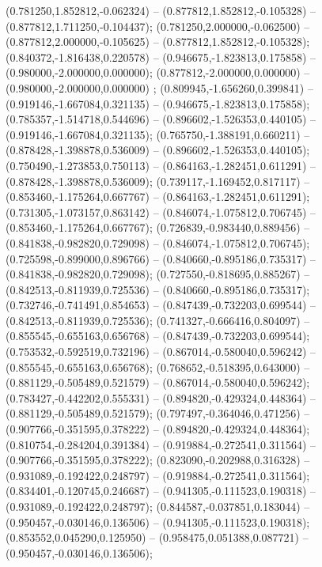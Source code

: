  (0.781250,1.852812,-0.062324) -- (0.877812,1.852812,-0.105328) -- (0.877812,1.711250,-0.104437);
 (0.781250,2.000000,-0.062500) -- (0.877812,2.000000,-0.105625) -- (0.877812,1.852812,-0.105328);
 (0.840372,-1.816438,0.220578) -- (0.946675,-1.823813,0.175858) -- (0.980000,-2.000000,0.000000);
 (0.877812,-2.000000,0.000000) -- (0.980000,-2.000000,0.000000) ;
 (0.809945,-1.656260,0.399841) -- (0.919146,-1.667084,0.321135) -- (0.946675,-1.823813,0.175858);
 (0.785357,-1.514718,0.544696) -- (0.896602,-1.526353,0.440105) -- (0.919146,-1.667084,0.321135);
 (0.765750,-1.388191,0.660211) -- (0.878428,-1.398878,0.536009) -- (0.896602,-1.526353,0.440105);
 (0.750490,-1.273853,0.750113) -- (0.864163,-1.282451,0.611291) -- (0.878428,-1.398878,0.536009);
 (0.739117,-1.169452,0.817117) -- (0.853460,-1.175264,0.667767) -- (0.864163,-1.282451,0.611291);
 (0.731305,-1.073157,0.863142) -- (0.846074,-1.075812,0.706745) -- (0.853460,-1.175264,0.667767);
 (0.726839,-0.983440,0.889456) -- (0.841838,-0.982820,0.729098) -- (0.846074,-1.075812,0.706745);
 (0.725598,-0.899000,0.896766) -- (0.840660,-0.895186,0.735317) -- (0.841838,-0.982820,0.729098);
 (0.727550,-0.818695,0.885267) -- (0.842513,-0.811939,0.725536) -- (0.840660,-0.895186,0.735317);
 (0.732746,-0.741491,0.854653) -- (0.847439,-0.732203,0.699544) -- (0.842513,-0.811939,0.725536);
 (0.741327,-0.666416,0.804097) -- (0.855545,-0.655163,0.656768) -- (0.847439,-0.732203,0.699544);
 (0.753532,-0.592519,0.732196) -- (0.867014,-0.580040,0.596242) -- (0.855545,-0.655163,0.656768);
 (0.768652,-0.518395,0.643000) -- (0.881129,-0.505489,0.521579) -- (0.867014,-0.580040,0.596242);
 (0.783427,-0.442202,0.555331) -- (0.894820,-0.429324,0.448364) -- (0.881129,-0.505489,0.521579);
 (0.797497,-0.364046,0.471256) -- (0.907766,-0.351595,0.378222) -- (0.894820,-0.429324,0.448364);
 (0.810754,-0.284204,0.391384) -- (0.919884,-0.272541,0.311564) -- (0.907766,-0.351595,0.378222);
 (0.823090,-0.202988,0.316328) -- (0.931089,-0.192422,0.248797) -- (0.919884,-0.272541,0.311564);
 (0.834401,-0.120745,0.246687) -- (0.941305,-0.111523,0.190318) -- (0.931089,-0.192422,0.248797);
 (0.844587,-0.037851,0.183044) -- (0.950457,-0.030146,0.136506) -- (0.941305,-0.111523,0.190318);
 (0.853552,0.045290,0.125950) -- (0.958475,0.051388,0.087721) -- (0.950457,-0.030146,0.136506);
